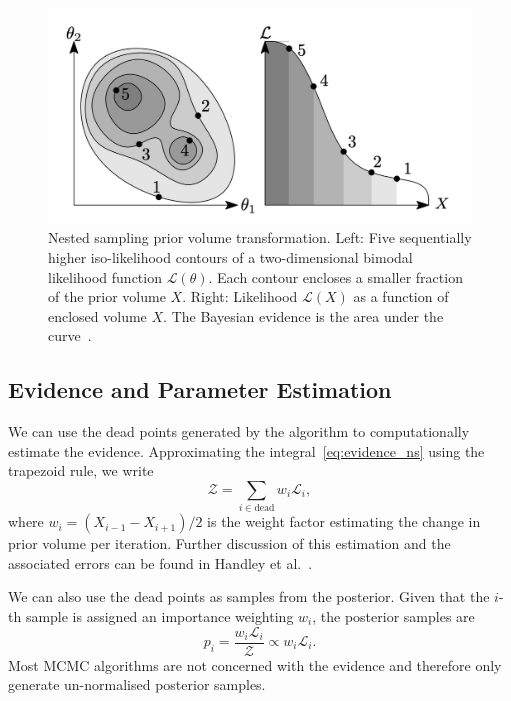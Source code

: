\documentclass[11pt]{article}
\begin{document}
    \begin{figure}[t!]
        \center
        \includegraphics[width=\linewidth]{../figures/NestedSamplingPolychord}
        \caption{
            Nested sampling prior volume transformation. Left: Five sequentially higher iso-likelihood contours of a
            two-dimensional bimodal likelihood function $\mathcal{L}(\theta)$. Each contour encloses a smaller fraction
            of the prior volume $X$. Right: Likelihood $\mathcal{L}(X)$ as a function of enclosed volume $X$. The
            Bayesian evidence is the area under the curve~\cite{Handley_polychord, Handley_2015}.
        }\label{fig:nested_sampling}
    \end{figure}


    \subsection{Evidence and Parameter Estimation}\label{subsec:evidence_param_estimation}
    We can use the dead points generated by the algorithm to computationally estimate the evidence.
    Approximating the integral~\eqref{eq:evidence_ns} using the trapezoid rule, we write
    \begin{equation}\label{eq:evidence_estimation}
    \mathcal{Z} = \sum_{i \in \text{dead}} w_i \mathcal{L}_i,
    \end{equation}
    where $w_i = (X_{i-1} - X_{i+1})/2$ is the weight factor estimating the change in prior volume per iteration.
    Further discussion of this estimation and the associated errors can be found in
    Handley et al.~\cite{Handley_2015, NS_Review_2022}.

    We can also use the dead points as samples from the posterior.
    Given that the $i$-th sample is assigned an importance weighting $w_i$, the posterior samples are
    \begin{equation}\label{eq:posterior_ns}
    p_i = \frac{w_i \mathcal{L}_i}{\mathcal{Z}} \propto w_i \mathcal{L}_i.
    \end{equation}
    Most MCMC algorithms are not concerned with the evidence and therefore only generate un-normalised posterior samples.
\end{document}
